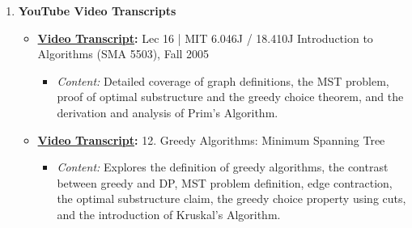 \documentclass{article}
\begin{document}
\begin{enumerate}
    \item \textbf{YouTube Video Transcripts}
    \begin{itemize}
        \item \textbf{\href{https://www.youtube.com/watch?v=FPEMBWg_WlY}{Video Transcript}:} Lec 16 | MIT 6.046J / 18.410J Introduction to Algorithms (SMA 5503), Fall 2005
        \begin{itemize}
            \item \emph{Content:} Detailed coverage of graph definitions, the MST problem, proof of optimal substructure and the greedy choice theorem, and the derivation and analysis of Prim's Algorithm.
        \end{itemize}
        \item \textbf{\href{https://www.youtube.com/watch?v=tKwnms5iRBU}{Video Transcript}:} 12. Greedy Algorithms: Minimum Spanning Tree
        \begin{itemize}
            \item \emph{Content:} Explores the definition of greedy algorithms, the contrast between greedy and DP, MST problem definition, edge contraction, the optimal substructure claim, the greedy choice property using cuts, and the introduction of Kruskal's Algorithm.
        \end{itemize}
    \end{itemize}
\end{enumerate}

\end{document}
